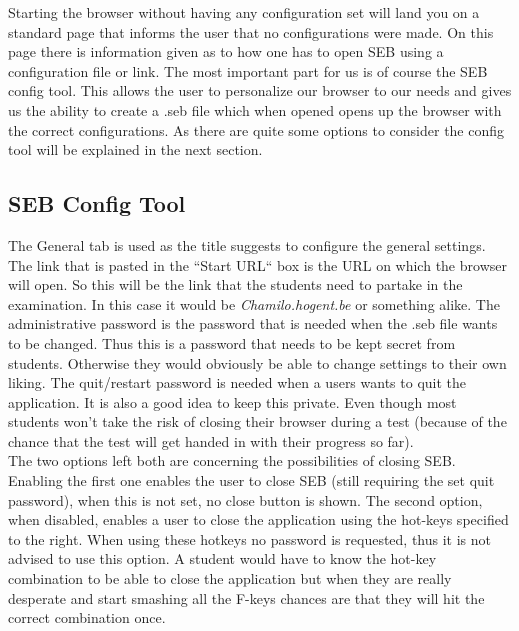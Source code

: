 Starting the browser without having any configuration set will land you on a standard page that informs the user that no configurations were made. On this page there is information given as to how one has to open SEB using a configuration file or link.
The most important part for us is of course the SEB config tool. This allows the user to personalize our browser to our needs and gives us the ability to create a .seb file which when opened opens up the browser with the correct configurations. As there are quite some options to consider the config tool will be explained in the next section.
\subsection{SEB Config Tool}
The General tab is used as the title suggests to configure the general settings. The link that is pasted in the ``Start URL`` box is the URL on which  the browser will open. So this will be the link that the students need to partake in the examination. In this case it would be \textit{Chamilo.hogent.be} or something alike. The administrative password is the password that is needed when the .seb file wants to be changed. Thus this is a password that needs to be kept secret from students. Otherwise they would obviously be able to change settings to their own liking. The quit/restart password is needed when a users wants to quit the application. It is also a good idea to keep this private. Even though most students won't take the risk of closing their browser during a test (because of the chance that the test will get handed in with their progress so far).\\

The two options left both are concerning the possibilities of closing SEB. Enabling the first one enables the user to close SEB (still requiring the set quit password), when this is not set, no close button is shown. The second option, when disabled, enables a user to close the application using the hot-keys specified to the right. When using these hotkeys no password is requested, thus it is not advised to use this option. A student would have to know the hot-key combination to be able to close the application but when they are really desperate and start smashing all the F-keys chances are that they will hit the correct combination once.\\

